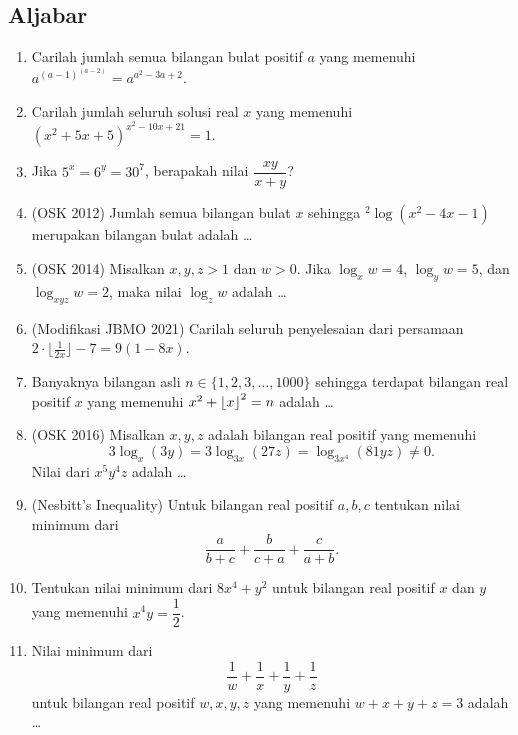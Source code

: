 \documentclass[11pt]{scrartcl}
\begin{document}
    \subsection{Aljabar}
    \begin{enumerate}
        \item Carilah jumlah semua bilangan bulat positif $a$ yang memenuhi $a^{(a-1)^{(a-2)}}=a^{a^2-3a+2}$.
        
        \item Carilah jumlah seluruh solusi real $x$ yang memenuhi $(x^2+5x+5)^{x^2-10x+21}=1.$
        
        \item Jika $5^x=6^y=30^7$, berapakah nilai $\dfrac{xy}{x+y}$?
        
        \item (OSK 2012) Jumlah semua bilangan bulat $x$ sehingga $^2 \log (x^2-4x-1)$ merupakan bilangan bulat adalah \dots
        
        \item (OSK 2014) Misalkan $x,y,z>1$ dan $w>0$. Jika $\log_x w = 4$, $\log_y w = 5$, dan $\log_{xyz} w = 2$, maka nilai $\log_z w$ adalah \dots 
        
        \item (Modifikasi JBMO 2021) Carilah seluruh penyelesaian dari persamaan $2\cdot \lfloor{\frac{1}{2x}}\rfloor - 7 = 9(1 - 8x)$.
        
        \item Banyaknya bilangan asli $n \in \{1,2,3,\dots,1000\}$ sehingga terdapat bilangan real positif $x$ yang memenuhi $x^2+\left\lfloor x \right\rfloor^2=n$ adalah \dots
        
        \item (OSK 2016) Misalkan $x,y,z$ adalah bilangan real positif yang memenuhi $$3 \log_x (3y) = 3 \log_{3x} (27z) = \log_{3x^4} (81yz) \neq 0.$$ Nilai dari $x^5y^4z$ adalah \dots
        
        \item (Nesbitt's Inequality) Untuk bilangan real positif $a,b,c$ tentukan nilai minimum dari $$\dfrac{a}{b+c}+\dfrac{b}{c+a}+\dfrac{c}{a+b}.$$
        
        \item Tentukan nilai minimum dari $8x^4+y^2$ untuk bilangan real positif $x$ dan $y$ yang memenuhi $x^4y=\dfrac{1}{2}$.
        
        \item Nilai minimum dari $$\dfrac{1}{w}+\dfrac{1}{x}+\dfrac{1}{y}+\dfrac{1}{z}$$
        untuk bilangan real positif $w,x,y,z$ yang memenuhi $w+x+y+z=3$ adalah \dots
        

\end{enumerate}
\end{document}
